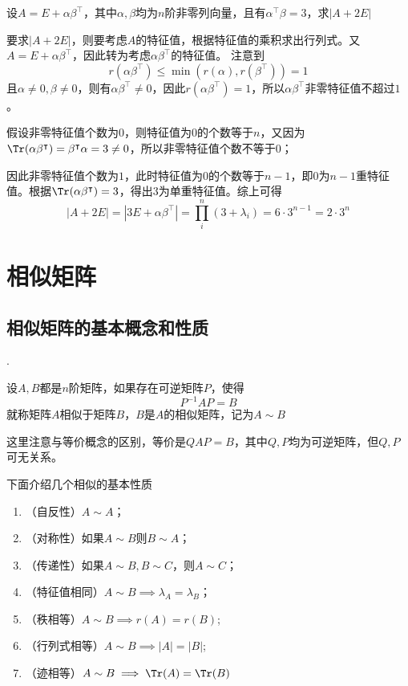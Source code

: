 \begin{example}
    设$A=E+\alpha\beta^\intercal$，其中$\alpha,\beta$均为$n$阶非零列向量，且有$\alpha^\intercal\beta=3$，求$|A+2E|$
\end{example}
\begin{solution}
    要求$|A+2E|$，则要考虑$A$的特征值，根据特征值的乘积求出行列式。又$A=E+\alpha\beta^\intercal$，因此转为考虑$\alpha\beta^\intercal$的特征值。
    注意到
    \[ r(\alpha\beta^\intercal) \leq \min(r(\alpha),r(\beta^\intercal)) = 1 \]
    且$\alpha\neq 0,\beta\neq 0$，则有$\alpha\beta^\intercal\neq 0$，因此$r(\alpha\beta^\intercal)=1$，所以$\alpha\beta^\intercal$非零特征值不超过$1$。

    假设非零特征值个数为$0$，则特征值为$0$的个数等于$n$，又因为$\Tr(\alpha\beta^\intercal)=\beta^\intercal\alpha = 3\neq 0$，所以非零特征值个数不等于$0$；

    因此非零特征值个数为$1$，此时特征值为$0$的个数等于$n-1$，即$0$为$n-1$重特征值。根据$\Tr(\alpha\beta^\intercal)=3$，得出$3$为单重特征值。综上可得
    \[ |A+2E| = |3E + \alpha\beta^\intercal| = \prod_i^n (3+\lambda_i) = 6\cdot 3^{n-1} = 2\cdot 3^n \]

\end{solution}

\section{相似矩阵}
\subsection{相似矩阵的基本概念和性质}
.
\begin{definition}
    设$A,B$都是$n$阶矩阵，如果存在可逆矩阵$P$，使得
    \[ P^{-1}AP = B \]
    就称矩阵$A$相似于矩阵$B$，$B$是$A$的相似矩阵，记为$A\sim B$
\end{definition}
这里注意与等价概念的区别，等价是$QAP=B$，其中$Q,P$均为可逆矩阵，但$Q,P$可无关系。

下面介绍几个相似的基本性质
\begin{enumerate}[(1)]
    \item （自反性）$A\sim A$；
    \item （对称性）如果$A\sim B$则$B \sim A$；
    \item （传递性）如果$A\sim B, B \sim C$，则$A\sim C$；
    \item （特征值相同）$A\sim B \implies \lambda_A = \lambda_B$；
    \item （秩相等）$A\sim B \implies r(A)=r(B)$;
    \item （行列式相等）$A\sim B \implies |A|=|B|$;
    \item （迹相等）$A\sim B \implies \Tr(A) = \Tr(B)$
\end{enumerate}

